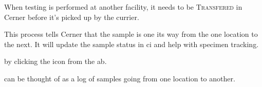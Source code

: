 
When testing is performed at another facility, it needs to be \textsc{Transfered} in Cerner before it's picked up by the currier.

This process tells Cerner that the sample is one its way from the one location to the next. It will update the sample status in \gls{ci} and help with specimen tracking.

 by clicking the  icon from the \gls{ab}.\\



 can be thought of as a log of samples going from one location to another.